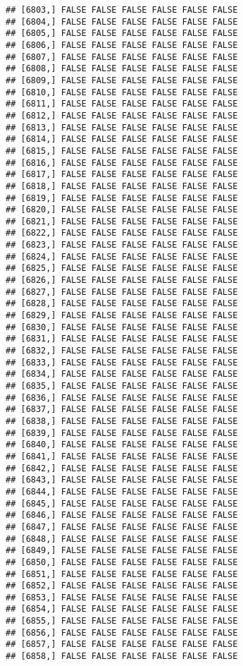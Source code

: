 \documentclass[
]{article}
\begin{document}
\begin{verbatim}
## [6803,] FALSE FALSE FALSE FALSE FALSE FALSE
## [6804,] FALSE FALSE FALSE FALSE FALSE FALSE
## [6805,] FALSE FALSE FALSE FALSE FALSE FALSE
## [6806,] FALSE FALSE FALSE FALSE FALSE FALSE
## [6807,] FALSE FALSE FALSE FALSE FALSE FALSE
## [6808,] FALSE FALSE FALSE FALSE FALSE FALSE
## [6809,] FALSE FALSE FALSE FALSE FALSE FALSE
## [6810,] FALSE FALSE FALSE FALSE FALSE FALSE
## [6811,] FALSE FALSE FALSE FALSE FALSE FALSE
## [6812,] FALSE FALSE FALSE FALSE FALSE FALSE
## [6813,] FALSE FALSE FALSE FALSE FALSE FALSE
## [6814,] FALSE FALSE FALSE FALSE FALSE FALSE
## [6815,] FALSE FALSE FALSE FALSE FALSE FALSE
## [6816,] FALSE FALSE FALSE FALSE FALSE FALSE
## [6817,] FALSE FALSE FALSE FALSE FALSE FALSE
## [6818,] FALSE FALSE FALSE FALSE FALSE FALSE
## [6819,] FALSE FALSE FALSE FALSE FALSE FALSE
## [6820,] FALSE FALSE FALSE FALSE FALSE FALSE
## [6821,] FALSE FALSE FALSE FALSE FALSE FALSE
## [6822,] FALSE FALSE FALSE FALSE FALSE FALSE
## [6823,] FALSE FALSE FALSE FALSE FALSE FALSE
## [6824,] FALSE FALSE FALSE FALSE FALSE FALSE
## [6825,] FALSE FALSE FALSE FALSE FALSE FALSE
## [6826,] FALSE FALSE FALSE FALSE FALSE FALSE
## [6827,] FALSE FALSE FALSE FALSE FALSE FALSE
## [6828,] FALSE FALSE FALSE FALSE FALSE FALSE
## [6829,] FALSE FALSE FALSE FALSE FALSE FALSE
## [6830,] FALSE FALSE FALSE FALSE FALSE FALSE
## [6831,] FALSE FALSE FALSE FALSE FALSE FALSE
## [6832,] FALSE FALSE FALSE FALSE FALSE FALSE
## [6833,] FALSE FALSE FALSE FALSE FALSE FALSE
## [6834,] FALSE FALSE FALSE FALSE FALSE FALSE
## [6835,] FALSE FALSE FALSE FALSE FALSE FALSE
## [6836,] FALSE FALSE FALSE FALSE FALSE FALSE
## [6837,] FALSE FALSE FALSE FALSE FALSE FALSE
## [6838,] FALSE FALSE FALSE FALSE FALSE FALSE
## [6839,] FALSE FALSE FALSE FALSE FALSE FALSE
## [6840,] FALSE FALSE FALSE FALSE FALSE FALSE
## [6841,] FALSE FALSE FALSE FALSE FALSE FALSE
## [6842,] FALSE FALSE FALSE FALSE FALSE FALSE
## [6843,] FALSE FALSE FALSE FALSE FALSE FALSE
## [6844,] FALSE FALSE FALSE FALSE FALSE FALSE
## [6845,] FALSE FALSE FALSE FALSE FALSE FALSE
## [6846,] FALSE FALSE FALSE FALSE FALSE FALSE
## [6847,] FALSE FALSE FALSE FALSE FALSE FALSE
## [6848,] FALSE FALSE FALSE FALSE FALSE FALSE
## [6849,] FALSE FALSE FALSE FALSE FALSE FALSE
## [6850,] FALSE FALSE FALSE FALSE FALSE FALSE
## [6851,] FALSE FALSE FALSE FALSE FALSE FALSE
## [6852,] FALSE FALSE FALSE FALSE FALSE FALSE
## [6853,] FALSE FALSE FALSE FALSE FALSE FALSE
## [6854,] FALSE FALSE FALSE FALSE FALSE FALSE
## [6855,] FALSE FALSE FALSE FALSE FALSE FALSE
## [6856,] FALSE FALSE FALSE FALSE FALSE FALSE
## [6857,] FALSE FALSE FALSE FALSE FALSE FALSE
## [6858,] FALSE FALSE FALSE FALSE FALSE FALSE

\end{verbatim}
\end{document}
